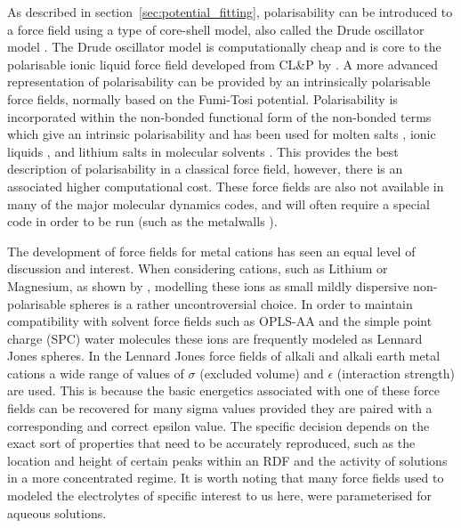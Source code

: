 \documentclass[../main.tex]{subfiles}
\begin{document}
As described in section~\ref{sec:potential_fitting}, polarisability can be introduced to a force field using a type of core-shell model, also called the Drude oscillator model \cite{schroder_polarizable_2020, schroder_comparing_2012, lindahl_gromacs_2021}. The Drude oscillator model is computationally cheap and is core to the polarisable ionic liquid force field developed from CL\&P by \citeauthor{schroder_comparing_2012} \cite{schroder_comparing_2012}. A more advanced representation of polarisability can be provided by an intrinsically polarisable force fields, normally based on the Fumi-Tosi potential. Polarisability is incorporated within the non-bonded functional form of the non-bonded terms which give an intrinsic polarisability and has been used for molten salts \cite{madden_covalent_1996}, ionic liquids \cite{borodin_polarizable_2009, schroder_polarizable_2020}, and lithium salts in molecular solvents \cite{borodin_litfsi_2006,bedrov_molecular_2019,bedrov_influence_2010}. This provides the best description of polarisability in a classical force field, however, there is an associated higher computational cost. These force fields are also not available in many of the major molecular dynamics codes, and will often require a special code in order to be run (such as the metalwalls \cite{marin-lafleche_metalwalls_2020}).

The development of force fields for metal cations has seen an equal level of discussion and interest. When considering cations, such as Lithium or Magnesium, as shown by \citeauthor{mamatkulov_force_2013} \cite{mamatkulov_force_2013,mamatkulov_force_2018}, modelling these ions as small mildly dispersive non-polarisable spheres is a rather uncontroversial choice\cite{schroder_polarizable_2020}. In order to maintain compatibility with solvent force fields such as OPLS-AA and the simple point charge (SPC) water molecules these ions are frequently modeled as Lennard Jones spheres. In the Lennard Jones force fields of alkali and alkali earth metal cations a wide range of values of $\sigma$ (excluded volume) and $\epsilon$ (interaction strength) are used. This is because the basic energetics associated with one of these force fields can be recovered for many sigma values provided they are paired with a corresponding and correct epsilon value. The specific decision depends on the exact sort of properties that need to be accurately reproduced, such as the location and height of certain peaks within an RDF and the activity of solutions in a more concentrated regime\cite{mamatkulov_force_2013}. It is worth noting that many force fields used to modeled the electrolytes of specific interest to us here, were parameterised for aqueous solutions.
\end{document}
